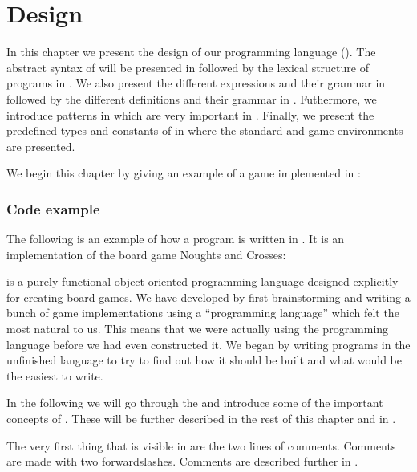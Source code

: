 \chapter{Design}
\label{chap:design}

In this chapter we present the design of our programming language
(\productname{}). The abstract syntax of \productname{} will be presented in
 followed by the lexical structure of programs in
. We also present the different expressions and
their grammar in  followed by the different definitions
and their grammar in . Futhermore, we introduce patterns
in  which are very important in \productname{}.  Finally,
we present the predefined types and constants of \productname{} in
 where the standard and game environments are presented.

We begin this chapter by giving an example of a game implemented in
\productname{}:

\subsection*{Code example}
\label{codesample}

The following is an example of how a program is written in \productname{}. It is
an implementation of the board game Noughts and Crosses:


\productname{} is a purely functional object-oriented programming language
designed explicitly for creating board games. We have developed \productname{}
by first brainstorming and writing a bunch of game implementations using a
``programming language'' which felt the most natural to us. This means that we 
were actually using the programming language before we had even constructed
it. We began by writing programs in the unfinished language to try to find out
how it should be built and what would be the easiest to write. 

In the following we will go through the 
and introduce some of the important concepts of \productname{}. These will be
further described in the rest of this chapter and in
.

The very first thing that is visible in  are the
two lines of comments. Comments are made with two forwardslashes. Comments are
described further in .

